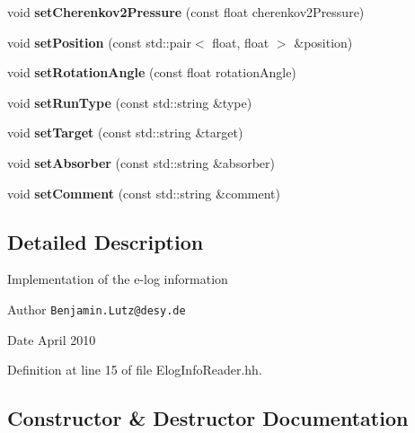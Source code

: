 \begin{DoxyCompactItemize}
\item 
void {\bfseries set\-Cherenkov2\-Pressure} (const float cherenkov2\-Pressure)\label{classElogInfo_afc2501169b05b2c69580b8937553375e}

\item 
void {\bfseries set\-Position} (const std\-::pair$<$ float, float $>$ \&position)\label{classElogInfo_aa828cb3e60d90027ec4c4f56703cc26a}

\item 
void {\bfseries set\-Rotation\-Angle} (const float rotation\-Angle)\label{classElogInfo_ae8537e6122d2d8d5dc3df90b3bde2d4b}

\item 
void {\bfseries set\-Run\-Type} (const std\-::string \&type)\label{classElogInfo_a97b06de867aee168950654a6e9d770af}

\item 
void {\bfseries set\-Target} (const std\-::string \&target)\label{classElogInfo_a58d5f086e49fbcf47841de86b73e0b08}

\item 
void {\bfseries set\-Absorber} (const std\-::string \&absorber)\label{classElogInfo_a94674b3055fba3b264dae4139ed7248a}

\item 
void {\bfseries set\-Comment} (const std\-::string \&comment)\label{classElogInfo_a12b1935c378d6bfe393de33323bd10eb}

\end{DoxyCompactItemize}


\subsection{Detailed Description}
Implementation of the e-\/log information

\begin{DoxyAuthor}{Author}
{\tt Benjamin.\-Lutz@desy.\-de} 
\end{DoxyAuthor}
\begin{DoxyDate}{Date}
April 2010 
\end{DoxyDate}


Definition at line 15 of file Elog\-Info\-Reader.\-hh.



\subsection{Constructor \& Destructor Documentation}
